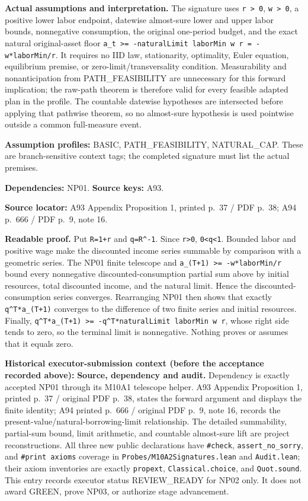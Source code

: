 \documentclass[
  11pt,
]{article}
\let\LedgerOriginalTexttt\texttt
\renewcommand{\texttt}[1]{{\small\LedgerOriginalTexttt{#1}}}
\begin{document}
\textbf{Actual assumptions and interpretation.} The signature uses
\texttt{r\ \textgreater{}\ 0}, \texttt{w\ \textgreater{}\ 0}, a positive
lower labor endpoint, datewise almost-sure lower and upper labor bounds,
nonnegative consumption, the original one-period budget, and the exact
natural original-asset floor
\texttt{a\_t\ \textgreater{}=\ -naturalLimit\ laborMin\ w\ r\ =\ -w*laborMin/r}.
It requires no IID law, stationarity, optimality, Euler equation,
equilibrium premise, or zero-limit/transversality condition.
Measurability and nonanticipation from PATH\_FEASIBILITY are unnecessary
for this forward implication; the raw-path theorem is therefore valid
for every feasible adapted plan in the profile. The countable datewise
hypotheses are intersected before applying that pathwise theorem, so no
almost-sure hypothesis is used pointwise outside a common full-measure
event.

\textbf{Assumption profiles:} BASIC, PATH\_FEASIBILITY, NATURAL\_CAP.
These are branch-sensitive context tags; the completed signature must
list the actual premises.

\textbf{Dependencies:} NP01. \textbf{Source keys:} A93.

\textbf{Source locator:} A93 Appendix Proposition 1, printed p.~37 / PDF
p.~38; A94 p.~666 / PDF p.~9, note 16.

\textbf{Readable proof.} Put \texttt{R=1+r} and \texttt{q=R\^{}-1}.
Since \texttt{r\textgreater{}0}, \texttt{0\textless{}q\textless{}1}.
Bounded labor and positive wage make the discounted income series
summable by comparison with a geometric series. The NP01 finite
telescope and \texttt{a\_(T+1)\ \textgreater{}=\ -w*laborMin/r} bound
every nonnegative discounted-consumption partial sum above by initial
resources, total discounted income, and the natural limit. Hence the
discounted-consumption series converges. Rearranging NP01 then shows
that exactly \texttt{q\^{}T*a\_(T+1)} converges to the difference of two
finite series and initial resources. Finally,
\texttt{q\^{}T*a\_(T+1)\ \textgreater{}=\ -q\^{}T*naturalLimit\ laborMin\ w\ r},
whose right side tends to zero, so the terminal limit is nonnegative.
Nothing proves or assumes that it equals zero.

\textbf{Historical executor-submission context (before the acceptance
recorded above):} \textbf{Source, dependency and audit.} Dependency is
exactly accepted NP01 through its M10A1 telescope helper. A93 Appendix
Proposition 1, printed p.~37 / original PDF p.~38, states the forward
argument and displays the finite identity; A94 printed p.~666 / original
PDF p.~9, note 16, records the present-value/natural-borrowing-limit
relationship. The detailed summability, partial-sum bound, limit
arithmetic, and countable almost-sure lift are project reconstructions.
All three new public declarations have \texttt{\#check},
\texttt{assert\_no\_sorry}, and \texttt{\#print\ axioms} coverage in
\texttt{Probes/M10A2Signatures.lean} and \texttt{Audit.lean}; their
axiom inventories are exactly \texttt{propext},
\texttt{Classical.choice}, and \texttt{Quot.sound}. This entry records
executor status REVIEW\_READY for NP02 only. It does not award GREEN,
prove NP03, or authorize stage advancement.
\end{document}
